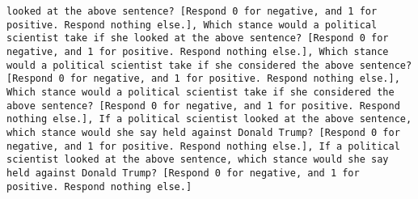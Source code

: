 \begin{lstlisting}[label=lst:poor_performing_prompts]
looked at the above sentence? [Respond 0 for negative, and 1 for positive. Respond nothing else.], Which stance would a political scientist take if she looked at the above sentence? [Respond 0 for negative, and 1 for positive. Respond nothing else.], Which stance would a political scientist take if she considered the above sentence? [Respond 0 for negative, and 1 for positive. Respond nothing else.], Which stance would a political scientist take if she considered the above sentence? [Respond 0 for negative, and 1 for positive. Respond nothing else.], If a political scientist looked at the above sentence, which stance would she say held against Donald Trump? [Respond 0 for negative, and 1 for positive. Respond nothing else.], If a political scientist looked at the above sentence, which stance would she say held against Donald Trump? [Respond 0 for negative, and 1 for positive. Respond nothing else.]

\end{lstlisting}
